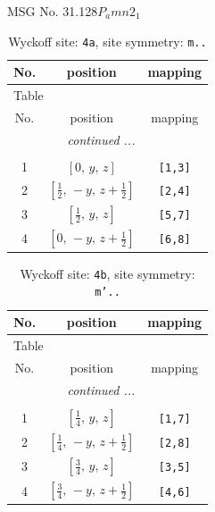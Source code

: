 \documentclass[fleqn,8pt]{jsarticle}
\begin{document}
\setcounter{MaxMatrixCols}{32}

\renewcommand{\tablename}{Table~}
\renewcommand{\figurename}{Figure~}
\begin{center}
\LARGE
MSG No. 31.128\quad$P_{a}mn2_{1}$
\end{center}
\renewcommand{\arraystretch}{1.2}
\begin{longtable}{ccc}
\caption{Wyckoff site: {\tt 4a}, site symmetry: {\tt m..}}
 \\
 \hline \hline
No. & position & mapping \\ \hline \endfirsthead

\multicolumn{2}{l}{\tablename\ \thetable{}} \\
 \hline \hline
No. & position & mapping \\ \hline \endhead

 \hline \hline
\multicolumn{2}{r}{\footnotesize\it continued ...} \\ \endfoot

 \hline \hline
\multicolumn{2}{r}{} \\ \endlastfoot

1 & $\left[ 0,\, y,\, z \right]$ & {\tt [1,3]} \\ \hline
2 & $\left[ \frac{1}{2},\, - y,\, z + \frac{1}{2} \right]$ & {\tt [2,4]} \\ \hline
3 & $\left[ \frac{1}{2},\, y,\, z \right]$ & {\tt [5,7]} \\ \hline
4 & $\left[ 0,\, - y,\, z + \frac{1}{2} \right]$ & {\tt [6,8]} \\
\end{longtable}
\renewcommand{\arraystretch}{1.2}
\begin{longtable}{ccc}
\caption{Wyckoff site: {\tt 4b}, site symmetry: {\tt m'..}}
 \\
 \hline \hline
No. & position & mapping \\ \hline \endfirsthead

\multicolumn{2}{l}{\tablename\ \thetable{}} \\
 \hline \hline
No. & position & mapping \\ \hline \endhead

 \hline \hline
\multicolumn{2}{r}{\footnotesize\it continued ...} \\ \endfoot

 \hline \hline
\multicolumn{2}{r}{} \\ \endlastfoot

1 & $\left[ \frac{1}{4},\, y,\, z \right]$ & {\tt [1,7]} \\ \hline
2 & $\left[ \frac{1}{4},\, - y,\, z + \frac{1}{2} \right]$ & {\tt [2,8]} \\ \hline
3 & $\left[ \frac{3}{4},\, y,\, z \right]$ & {\tt [3,5]} \\ \hline
4 & $\left[ \frac{3}{4},\, - y,\, z + \frac{1}{2} \right]$ & {\tt [4,6]} \\
\end{longtable}
\end{document}

